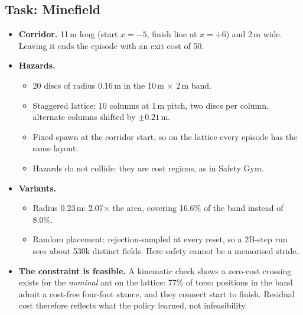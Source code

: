 \documentclass[sigconf,review]{acmart}
\begin{document}
\subsection{Task: Minefield}
\begin{itemize}
\item \textbf{Corridor.} 11\,m long (start $x = -5$, finish line at $x = +6$) and 2\,m wide. Leaving it ends the episode with an exit cost of 50.
\item \textbf{Hazards.}
  \begin{itemize}
  \item 20 discs of radius 0.16\,m in the 10\,m $\times$ 2\,m band.
  \item Staggered lattice: 10 columns at 1\,m pitch, two discs per column, alternate columns shifted by $\pm 0.21$\,m.
  \item Fixed spawn at the corridor start, so on the lattice every episode has the same layout.
  \item Hazards do not collide: they are cost regions, as in Safety Gym.
  \end{itemize}
\item \textbf{Variants.}
  \begin{itemize}
  \item Radius 0.23\,m: 2.07$\times$ the area, covering 16.6\% of the band instead of 8.0\%.
  \item Random placement: rejection-sampled at every reset, so a 2B-step run sees about 530k distinct fields. Here safety cannot be a memorised stride.
  \end{itemize}
\item \textbf{The constraint is feasible.} A kinematic check shows a zero-cost crossing exists for the \emph{nominal} ant on the lattice: 77\% of torso positions in the band admit a cost-free four-foot stance, and they connect start to finish. Residual cost therefore reflects what the policy learned, not infeasibility.
\end{itemize}
\end{document}
